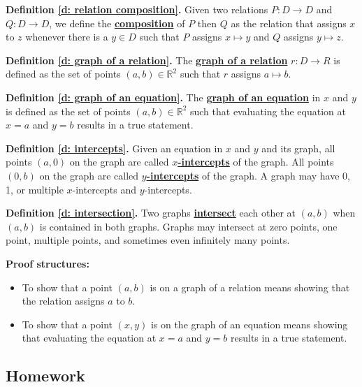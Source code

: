 \documentclass[11pt]{article}
\newcommand{\R}{\mathbb{R}}
\renewcommand\emph[1]{\underline{\bf{#1}}} %
\theoremstyle{definition}
\begin{document}
\vfill 

{\bf Definition \ref{d: relation composition}.}
Given two relations $P:D\to D$ and $Q:D\to D$, we define the \emph{composition} of $P$ then $Q$ 
as the relation that assigns $x$ to $z$ whenever there is a $y\in D$ such that $P$ assigns $x\mapsto y$ and $Q$ assigns $y\mapsto z$.

\vfill
{\bf Definition \ref{d: graph of a relation}.}
The \emph{graph of a relation} $r:D\to R$ is defined as the set of points $(a, b)\in \R^2$ such that $r$ assigns $a\mapsto b$.

{\bf Definition \ref{d: graph of an equation}.}
The \emph{graph of an equation} in $x$ and $y$ is defined as the set of points $(a, b) \in \R^2$ such that evaluating the equation at $x=a$ and $y=b$ results in a true statement.

\vfill

{\bf Definition \ref{d: intercepts}.}
Given an equation in $x$ and $y$ and its graph, all points $(a,0)$ on the graph are called \emph{$x$-intercepts} of the graph. All points $(0,b)$ on the graph are called \emph{$y$-intercepts} of the graph. A graph may have 0, 1, or multiple $x$-intercepts and $y$-intercepts.

\vfill
{\bf Definition \ref{d: intersection}.}
Two graphs \emph{intersect} each other at $(a,b)$ when $(a,b)$ is contained in both graphs.  Graphs may intersect at zero points, one point, multiple points, and sometimes even infinitely many points.

\vfill
{\bf Proof structures:}
\begin{itemize}
\item To show that a point $(a, b)$ is on a graph of a relation means showing that the relation assigns $a$ to $b$.

\item To show that a point $(x, y)$ is on the graph of an equation means showing that evaluating the equation at $x=a$ and $y=b$ results in a true statement.
\end{itemize}

\vfill 

\newpage \subsection{Homework}
\end{document}
